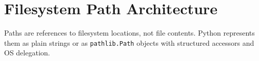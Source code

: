 \section{Filesystem Path Architecture}

Paths are references to filesystem locations, not file contents. Python represents them as plain strings or as \texttt{pathlib.Path} objects with structured accessors and OS delegation.
